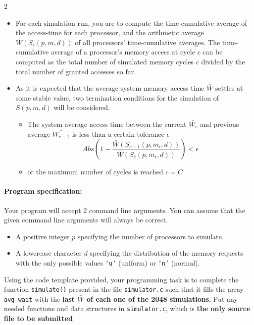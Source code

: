 \documentclass[12pt]{article}
\begin{document}
\begin{multicols}{2}
\begin{itemize}
  \item For each simulation run, you are to compute the time-cumulative average of the access-time for each processor, and the arithmetic average $\bar{W}\left(S_c(p,m,d)\right)$ of all processors' time-cumulative averages. The time-cumulative average of a processor's memory access at cycle $c$ can be computed as the total number of simulated memory cycles $c$ divided by the total number of granted accesses so far.  
  
  \item As it is expected that the average system memory access time $\bar{W}$ settles at some stable value, two termination conditions for the simulation of $S(p,m,d)$ will be considered. 
  
  \begin{itemize}
  \item The system average access time between the current  $\bar{W_c}$ and previous average $\bar{W_{c-1}}$ is less than a certain tolerance $\epsilon$
    \[ 
 Abs  \left( 1- \frac{ \bar{W} \left( S_{c-1}(p,m_i,d) \right) }{ \bar{W} \left( S_c (p,m_i,d) \right) } \right) <  \epsilon 
    \]
    \item or the maximum number of cycles is reached $c=C$
    \end{itemize}
  \end{itemize}
    
  \paragraph{Program specification:} Your program will accept 2 command line arguments. You can assume that the given command line arguments will always be correct.
  \begin{itemize}
  \item A positive integer $p$ specifying the number of processors to simulate.
  \item A lowercase character $d$ specifying the distribution of the memory requests with the only possible values \texttt{`u'} (uniform) or \texttt{`n'} (normal).
  \end{itemize}

  Using the code template provided, your programming task is to complete the function \texttt{simulate()} present in the file \texttt{simulator.c} such that it fills the array \texttt{avg\_wait} with the \textbf{last $\bar{W}$ of each one of the 2048 simulations}. Put any needed functions and data structures in \texttt{simulator.c}, which is \textbf{the only source file to be submitted}


\end{multicols}
\end{document}
